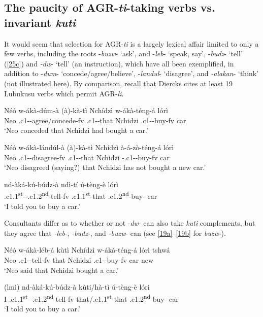 \documentclass[output=paper,
modfonts
]{langscibook}
\begin{document}
\subsection{The paucity of AGR-\textit{ti}-taking verbs vs. invariant \textit{kuti}}

It would seem that selection for AGR-\textit{ti} is a largely lexical affair limited to only a few verbs, including the roots -\textit{buzw}- `ask', and -\textit{leb}- `speak, say', -\textit{budz}- `tell' (\ref{25c})  and \textit{-dw}- `tell' (an instruction), which have all been exemplified, in addition to -\textit{dum}- `concede/agree/believe', -\textit{landul}- `disagree', and  \textit{-alakan}- `think' (not illustrated here). By comparison, recall that Diercks cites at least 19 Lubukusu verbs which permit AGR-\textit{li}.

\ea
\ea \gll Néó  w-ákà-dúm-à (à)-kà-tì Nchídzì  w-ákà-téng-á lórì\\
	Neo .c1--agree/concede-fv .c1--that Nchidzi
    .c1--buy-fv car\\
	\glt `Neo conceded that Nchidzi had bought a car.'

\ex \gll Néó w-ákà-lándúl-à (à)-kà-tì Nchídzì à-á-zò-téng-á lórì \\
	Neo .c1--disagree-fv .c1--that Nchidzi -.c1--buy-fv car \\
	\glt `Neo disagreed (saying?) that Nchidzi has not bought a new car.'

\ex \label{25c} \gll nd-àká-kú-búdz-à ndì-tí ú-tèng-è lórì\\
	.c1.1\textsuperscript{st}--.c1.2\textsuperscript{nd}-tell-fv .c1.1\textsuperscript{st}-that
    .c1.2\textsuperscript{nd}-buy- car\\
	\glt `I told you to buy a car.' \z\z

Consultants differ as to whether or not -\textit{dw}- can also take \textit{kuti} complements, but they agree that \textit{-leb}-, \textit{-budz}-, and \textit{-buzw}- can (see \ref{19a}--\ref{19b} for \textit{buzw}-).

\ea
\ea \gll Néó w-ákà-léb-á kùtì  Nchídzì w-ákà-téng-á lórì tshwá\\
	Neo	.c1--tell-fv that Nchidzi .c1--buy-fv car new\\
	\glt `Neo said that Nchidzi bought a car.'

\ex \gll (ìmì) nd-àká-kú-búdz-à kùti/hà-tì ú-tèng-è lórì\\
      I .c1.1\textsuperscript{st}--.c1.2\textsuperscript{nd}-tell-fv that/.c1.1\textsuperscript{st}-that .c1.2\textsuperscript{nd}-buy- car\\
	\glt `I told you to buy a car.' \z\z
\end{document}
